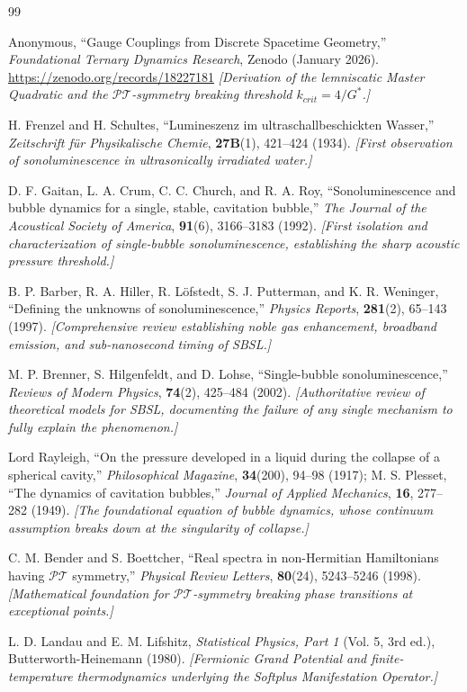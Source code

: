 \documentclass[11pt, letterpaper]{article}
\newcommand{\G}{G^*}
\newcommand{\PT}{\mathcal{PT}}
\theoremstyle{definition}
\theoremstyle{remark}
\begin{document}
\begin{thebibliography}{99}

Anonymous,
``Gauge Couplings from Discrete Spacetime Geometry,''
\textit{Foundational Ternary Dynamics Research}, Zenodo (January 2026).
\url{https://zenodo.org/records/18227181}
\newblock \textit{[Derivation of the lemniscatic Master Quadratic and the $\PT$-symmetry breaking threshold $k_{crit} = 4/\G$.]}

H. Frenzel and H. Schultes,
``Lumineszenz im ultraschallbeschickten Wasser,''
\textit{Zeitschrift f\"ur Physikalische Chemie}, \textbf{27B}(1), 421--424 (1934).
\newblock \textit{[First observation of sonoluminescence in ultrasonically irradiated water.]}

D. F. Gaitan, L. A. Crum, C. C. Church, and R. A. Roy,
``Sonoluminescence and bubble dynamics for a single, stable, cavitation bubble,''
\textit{The Journal of the Acoustical Society of America}, \textbf{91}(6), 3166--3183 (1992).
\newblock \textit{[First isolation and characterization of single-bubble sonoluminescence, establishing the sharp acoustic pressure threshold.]}

B. P. Barber, R. A. Hiller, R. L\"ofstedt, S. J. Putterman, and K. R. Weninger,
``Defining the unknowns of sonoluminescence,''
\textit{Physics Reports}, \textbf{281}(2), 65--143 (1997).
\newblock \textit{[Comprehensive review establishing noble gas enhancement, broadband emission, and sub-nanosecond timing of SBSL.]}

M. P. Brenner, S. Hilgenfeldt, and D. Lohse,
``Single-bubble sonoluminescence,''
\textit{Reviews of Modern Physics}, \textbf{74}(2), 425--484 (2002).
\newblock \textit{[Authoritative review of theoretical models for SBSL, documenting the failure of any single mechanism to fully explain the phenomenon.]}

Lord Rayleigh,
``On the pressure developed in a liquid during the collapse of a spherical cavity,''
\textit{Philosophical Magazine}, \textbf{34}(200), 94--98 (1917);
M. S. Plesset,
``The dynamics of cavitation bubbles,''
\textit{Journal of Applied Mechanics}, \textbf{16}, 277--282 (1949).
\newblock \textit{[The foundational equation of bubble dynamics, whose continuum assumption breaks down at the singularity of collapse.]}

C. M. Bender and S. Boettcher,
``Real spectra in non-Hermitian Hamiltonians having $\mathcal{PT}$ symmetry,''
\textit{Physical Review Letters}, \textbf{80}(24), 5243--5246 (1998).
\newblock \textit{[Mathematical foundation for $\PT$-symmetry breaking phase transitions at exceptional points.]}

L. D. Landau and E. M. Lifshitz,
\textit{Statistical Physics, Part 1} (Vol. 5, 3rd ed.), Butterworth-Heinemann (1980).
\newblock \textit{[Fermionic Grand Potential and finite-temperature thermodynamics underlying the Softplus Manifestation Operator.]}

\end{thebibliography}
\end{document}

